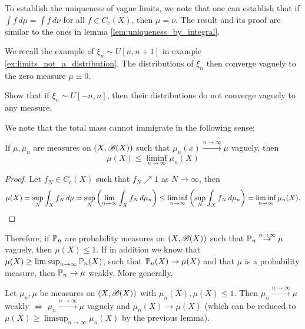 \begin{unexaminable}
\begin{remark}
To establish the uniqueness of vague limits, we note that one can establish that if $\int f \, d\mu = \int f \, d\nu$ for all $f \in C_c(X)$, then $\mu = \nu$. The result and its proof are similar to the ones in lemma \ref{lem:uniqueness_by_integral}.
\end{remark}

\begin{example}
We recall the example of $\xi_n \sim U[n,n+1]$ in example \ref{ex:limits_not_a_distribution}. The distributions of $\xi_n$ then converge vaguely to the zero measure $\mu \equiv 0$.
\end{example}

\begin{exercise}
Show that if $\xi_n \sim U[-n,n]$, then their distributions do not converge vaguely to any measure.
\end{exercise}

We note that the total mass cannot immigrate in the following sense:
\begin{proposition}
If $\mu, \mu_n$ are measures on $(X,\mathcal{B}(X))$ such that $\mu_n(x) \overset{n\to\infty}\to \mu$ vaguely, then 
\begin{equation}
    \mu(X) \leq \liminf_{n\to\infty} \mu_n(X)
\end{equation}
\end{proposition}

\begin{proof}
Let $f_N \in C_c(X)$ such that $f_N \nearrow 1$ as $N\to\infty$, then
\begin{equation*}
    \mu(X) = \sup_{N} \int_X f_N \, d\mu = \sup_N \left( \lim_{n\to\infty} \int_X f_N \, d\mu_n \right) \leq \liminf_{n\to\infty} \left( \sup_N \int_X f_N \, d\mu_n \right) = \liminf_{n\to\infty} \mu_n(X).
\end{equation*}
\end{proof}

Therefore, if $\mathbb{P}_n$ are probability measures on $(X,\mathcal{B}(X))$ such that $\mathbb{P}_n \overset{n\to\infty}\to \mu$ vaguely, then $\mu(X) \leq 1$. If in addition we know that $\mu(X) \geq \limsup_{n\to\infty} \mathbb{P}_n(X)$, such that $\mathbb{P}_n(X) \to \mu(X)$ and that $\mu$ is a probability measure, then $\mathbb{P}_n \to \mu$ weakly. More generally,
\begin{proposition}
Let $\mu_n, \mu$ be measures on $(X,\mathcal{B}(X))$ with $\mu_n(X), \mu(X) \leq 1$. Then $\mu_n \overset{n\to\infty}\to \mu$ weakly $\iff$ $\mu_n \overset{n\to\infty}\to \mu$ vaguely and $\mu_n(X) \to \mu(X)$ (which can be reduced to $\mu(X) \geq \limsup_{n\to\infty} \mu_n(X)$ by the previous lemma).
\end{proposition}


\end{unexaminable}
